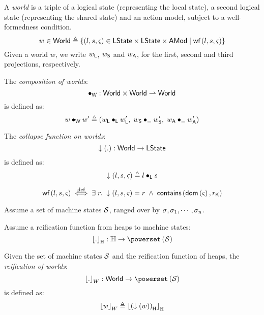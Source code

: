 %
%
\begin{definition}[Worlds]
A \emph{world} is a triple of a logical state (representing the local state), a second logical state (representing the shared state) and an action model, subject to a well-formedness condition.
%
\[
	w \in \textsf{World} \triangleq \left\{ (l, s, \varsigma_{}) \in \textsf{LState} \times \textsf{LState} \times \textsf{AMod} \;|\; \textsf{wf}\left( l, s, \varsigma_{} \right) \right\}
\]
% 
Given a world $w$, we write $w_{\textsf{L}}$, $w_{\textsf{S}}$ and $w_{\textsf{A}}$, for the first, second and third projections, respectively.
% 
\end{definition}
%
%
\begin{definition}
The \emph{composition of worlds}:
%
\[
	\bullet_{\textsf{W}} : \textsf{World} \times \textsf{World} \rightharpoonup \textsf{World}
\]
%
is defined as:
%
\[
	w \bullet_{\textsf{W}} w' \triangleq (w_{\textsf{L}} \bullet_{\textsf{L}} w'_{\textsf{L}},\; w_{\textsf{S}} \bullet_{=} w'_{\textsf{S}},\; w_{\textsf{A}} \bullet_{=} w'_{\textsf{A}})
\]
%
\end{definition}
%
%
\begin{definition}
The \emph{collapse function on worlds}:
%
\[
	\downarrow\left(.\right): \textsf{World} \rightarrow \textsf{LState}
\]
%
is defined as:
%
\[
	\downarrow\left(l, s, \varsigma_{}\right) \triangleq l \bullet_{\textsf{L}} s
\]
%
\end{definition}
%
%
\begin{definition}
%
\[
	\textsf{wf}\left( l, s, \varsigma_{} \right) \stackrel{\mathrm{def}}{\iff} \exists\; r.\; \downarrow\left(l, s, \varsigma_{}\right) = r \;\land\; \textsf{contains}\left(\textsf{dom}\left( \varsigma_{} \right), r_{\textsf{K}}\right)
\]
%

\end{definition}
%
%
\begin{parameter}
Assume a set of machine states $\mathcal{S}$, ranged over by $\sigma_{}, \sigma_{1}, \cdots, \sigma_{n}$.
\end{parameter}
%
%
\begin{parameter}
Assume a reification function from heaps to machine states:
%
\[
	\reifyH{.}: \Heaps \rightarrow \pset{\MStates} 
\]
%
\end{parameter}
%
%
\begin{definition}[Reification]
Given the set of machine states $\mathcal{S}$ and the reification function of heaps, the \emph{reification of worlds}:
%
\[
	\reifyW{.} : \Worlds \rightarrow \pset{\MStates}
\]
%
is defined as:
%
\[
	\left\lfloor w \right\rfloor_{W} \triangleq \left\lfloor \left(\downarrow\left(w\right)\right)_{\textsf{H}} \right\rfloor_{\mathbb{H}}
\]
%
\end{definition}
